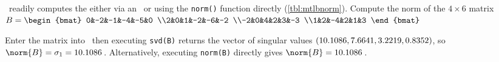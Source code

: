 \begin{example} 
\script\ readily computes the  either via an \svd\ or using the \verb|norm()| function directly (\cref{tbl:mtlbnorm}).
%
Compute the norm of the \(4\times6\) matrix
\(B=\begin{bmat} 
0&-2&-1&-4&-5&0
\\2&0&1&-2&-6&-2
\\-2&0&4&2&3&-3
\\1&2&-4&2&1&3
\end{bmat}\)
\begin{solution} 
Enter the matrix into \script\ then executing \verb|svd(B)| returns the vector of singular values
\setbox\ajrqrbox\hbox{}%
\marginajrbox%
\(\sloppy(10.1086,7.6641,3.2219,0.8352)\),
so \(\norm{B}=\sigma_1=10.1086\)\,.
Alternatively, executing \verb|norm(B)| directly gives  \(\norm{B}=10.1086\)\,.
\end{solution}

\end{example}










